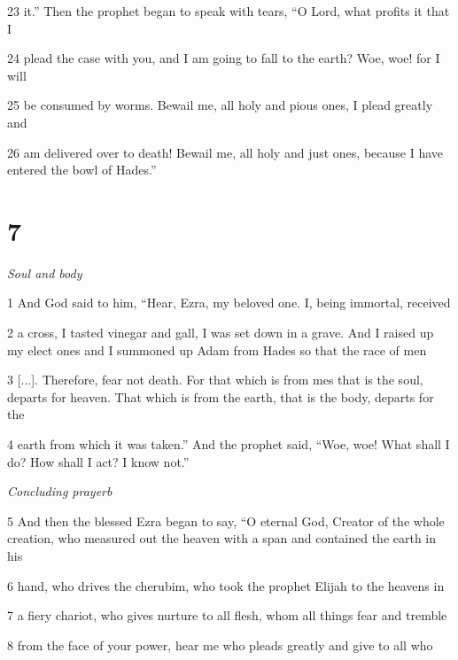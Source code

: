 \par 23 it.” Then the prophet began to speak with tears, “O Lord, what profits it that I

\par 24 plead the case with you, and I am going to fall to the earth? Woe, woe! for I will

\par 25 be consumed by worms. Bewail me, all holy and pious ones, I plead greatly and

\par 26 am delivered over to death! Bewail me, all holy and just ones, because I have entered the bowl of Hades.”

\chapter{7}

\par \textit{Soul and body}

\par 1 And God said to him, “Hear, Ezra, my beloved one. I, being immortal, received

\par 2 a cross, I tasted vinegar and gall, I was set down in a grave. And I raised up my elect ones and I summoned up Adam from Hades so that the race of men

\par 3 [...]. Therefore, fear not death. For that which is from mes that is the soul, departs for heaven. That which is from the earth, that is the body, departs for the

\par 4 earth from which it was taken.” And the prophet said, “Woe, woe! What shall I do? How shall I act? I know not.”

\par \textit{Concluding prayerb}

\par 5 And then the blessed Ezra began to say, “O eternal God, Creator of the whole creation, who measured out the heaven with a span and contained the earth in his

\par 6 hand, who drives the cherubim, who took the prophet Elijah to the heavens in

\par 7 a fiery chariot, who gives nurture to all flesh, whom all things fear and tremble

\par 8 from the face of your power, hear me who pleads greatly and give to all who 

